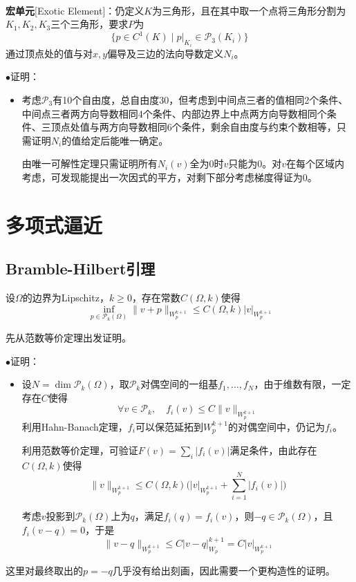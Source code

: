\documentclass[a4paper,UTF8,fontset=windows]{ctexart}
\newcommand*{\cp}{\mathcal{P}}
\newcommand{\proo}[1]{{\kaishu $\bullet$证明：
\begin{itemize}
    \item[] #1
\end{itemize}
}}
\begin{document}
\

\textbf{宏单元}[Exotic Element]：仍定义$K$为三角形，且在其中取一个点将三角形分割为$K_1,K_2,K_3$三个三角形，要求$P$为
$$\{p\in C^1(K)\mid p|_{K_i}\in \cp_3(K_i)\}$$
通过顶点处的值与对$x,y$偏导及三边的法向导数定义$N_i$。

\proo{
    考虑$\cp_3$有10个自由度，总自由度30，但考虑到中间点三者的值相同2个条件、中间点三者两方向导数相同4个条件、内部边界上中点两方向导数相同个条件、三顶点处值与两方向导数相同6个条件，剩余自由度与约束个数相等，只需证明$N_i$的值给定后能唯一确定。

    由唯一可解性定理只需证明所有$N_i(v)$全为0时$v$只能为0。对$v$在每个区域内考虑，可发现能提出一次因式的平方，对剩下部分考虑梯度得证为0。
}

\section{多项式逼近}
\subsection{Bramble-Hilbert引理}
设$\Omega$的边界为Lipschitz，$k\ge0$，存在常数$C(\Omega,k)$使得
$$\inf_{p\in \cp_k(\Omega)}\|v+p\|_{W_p^{k+1}}\le C(\Omega,k)|v|_{W_p^{k+1}}$$

先从范数等价定理出发证明。

\proo{
    设$N=\dim \cp_k(\Omega)$，取$\cp_k$对偶空间的一组基$f_1,\dots,f_N$，由于维数有限，一定存在$C$使得
    $$\forall v\in \cp_k,\quad f_i(v)\le C\|v\|_{W_p^{k+1}}$$
    利用Hahn-Banach定理，$f_i$可以保范延拓到$W_p^{k+1}$的对偶空间中，仍记为$f_i$。

    利用范数等价定理，可验证$F(v)=\sum_i|f_i(v)|$满足条件，由此存在$C(\Omega,k)$使得
    $$\|v\|_{W_p^{k+1}}\le C(\Omega,k)\bigg(|v|_{W_p^{k+1}}+\sum_{i=1}^N|f_i(v)|\bigg)$$

    考虑$v$投影到$\cp_k(\Omega)$上为$q$，满足$f_i(q)=f_i(v)$，则$-q\in \cp_k(\Omega)$，且$f_i(v-q)=0$，于是
    $$\|v-q\|_{W_p^{k+1}}\le C|v-q|_{W_p}^{k+1}=C|v|_{W_p^{k+1}}$$
}

这里对最终取出的$p=-q$几乎没有给出刻画，因此需要一个更构造性的证明。
\end{document}
